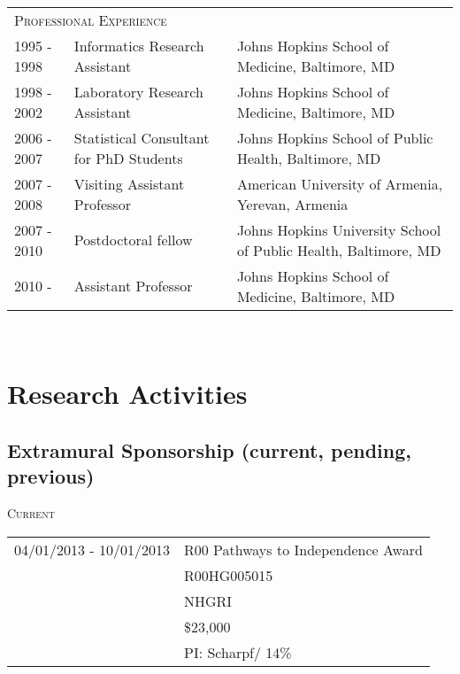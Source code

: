 \documentclass[11pt]{article}%
\begin{document}
\vspace{1em}\\
\begin{tabular}{llp{3.8in}}
\multicolumn{3}{l}{\large \textsc{Professional Experience}}\\
 1995 - 1998 & Informatics Research Assistant &Johns Hopkins School of Medicine,
  Baltimore, MD\\
 1998 - 2002 & Laboratory Research Assistant & Johns Hopkins School of Medicine,
  Baltimore, MD\\
2006 - 2007 & Statistical Consultant for PhD Students
& Johns Hopkins School of Public Health, Baltimore, MD \\
2007 - 2008 & Visiting Assistant Professor &American University of
Armenia, Yerevan, Armenia\\
2007 - 2010 & Postdoctoral fellow & Johns Hopkins University School of
Public Health, Baltimore, MD\\
2010 - & Assistant Professor & Johns Hopkins School of Medicine,
Baltimore, MD
\end{tabular}\\

\section*{\sc Research Activities}


%


\subsection*{\sc Extramural Sponsorship (current, pending, previous)}
\textsc{Current}

\begin{tabular}{ll}
  04/01/2013 - 10/01/2013 & R00 Pathways to Independence Award \\
  & R00HG005015\\
  & NHGRI \\
  & \$23,000 \\
  & PI: Scharpf/ 14\%\\
\end{tabular}
\end{document}
